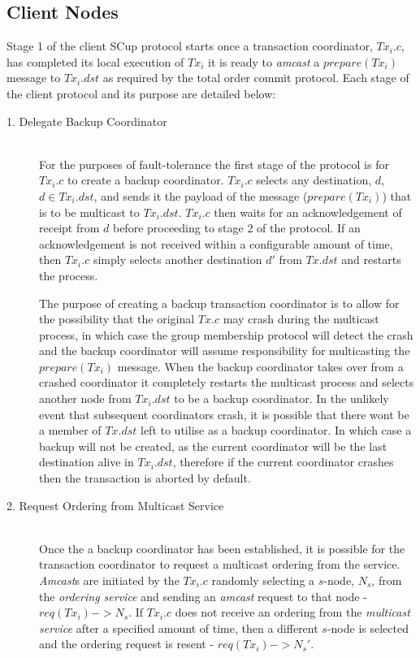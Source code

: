    \subsection*{Client Nodes}
    Stage 1 of the client \textsf{SCup} protocol starts once a transaction coordinator, $Tx_i.c$, has completed its local execution of $Tx_i$ it is ready to \emph{amcast} a $prepare(Tx_i)$ message to $Tx_i.dst$ as required by the total order commit protocol.  Each stage of the client protocol and its purpose are detailed below:
    \begin{description}
    
        \item[1. Delegate Backup Coordinator] \hfill \\
        For the purposes of fault-tolerance the first stage of the protocol is for $Tx_i.c$ to create a backup coordinator.  $Tx_i.c$ selects any destination, $d$, $d \in Tx_i.dst$, and sends it the payload of the message ($prepare(Tx_i)$) that is to be multicast to $Tx_i.dst$.  $Tx_i.c$ then waits for an acknowledgement of receipt from $d$ before proceeding to stage 2 of the protocol.  If an acknowledgement is not received within a configurable amount of time, then $Tx_i.c$ simply selects another destination $d'$ from $Tx.dst$ and restarts the process.  
        
        The purpose of creating a backup transaction coordinator is to allow for the possibility that the original $Tx.c$ may crash during the multicast process, in which case the group membership protocol will detect the crash and the backup coordinator will assume responsibility for multicasting the $prepare(Tx_i)$ message.  When the backup coordinator takes over from a crashed coordinator it completely restarts the multicast process and selects another node from $Tx_i.dst$ to be a backup coordinator.  In the unlikely event that subsequent coordinators crash, it is possible that there wont be a member of $Tx.dst$ left to utilise as a backup coordinator.  In which case a backup will not be created, as the current coordinator will be the last destination alive in $Tx_i.dst$, therefore if the current coordinator crashes then the transaction is aborted by default.  
                
        \item[2. Request Ordering from Multicast Service] \hfill \\
        Once the a backup coordinator has been established, it is possible for the transaction coordinator to request a multicast ordering from the service.  \emph{Amcast}s are initiated by the $Tx_i.c$ randomly selecting a $s$-node, $N_s$, from the \emph{ordering service} and sending an \emph{amcast} request to that node - $req(Tx_i) -> N_s$.  If $Tx_i.c$ does not receive an ordering from the \emph{multicast service} after a specified amount of time, then a different $s$-node is selected and the ordering request is resent - $req(Tx_i) -> N_s'$.  
        

\end{description}

